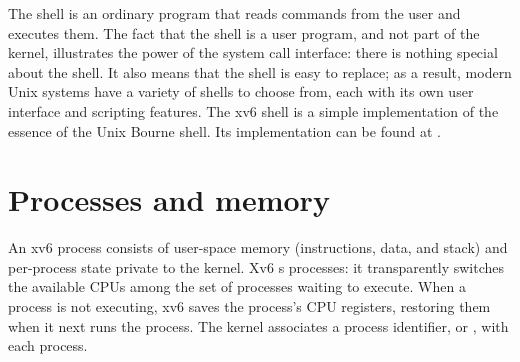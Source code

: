 The shell is an ordinary program that reads commands from the user
and executes them.
The fact that the shell is a user program, and not part of the kernel,
illustrates the power of the system call interface: there is nothing
special about the shell.
It also means that the shell is easy to replace; as a result,
modern Unix systems have a variety of
shells to choose from, each with its own user interface
and scripting features.
The xv6 shell is a simple implementation of the essence of
the Unix Bourne shell.  Its implementation can be found at
.
\section{Processes and memory}

An xv6 process consists of user-space memory (instructions, data, and stack)
and per-process state private to the kernel.
Xv6
s
processes: it transparently switches the available CPUs
among the set of processes waiting to execute.
When a process is not executing, xv6 saves the process's CPU registers,
restoring them when it next runs the process.
The kernel associates a process identifier, or
,
with each process.

